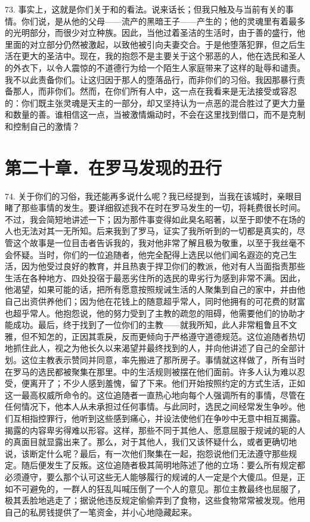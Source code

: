 73. 事实上，这就是你们关于和的看法。说来话长；但我只触及与当前有关的事情。你们说，是从他的父母——流产的黑暗王子——产生的；他的灵魂里有着最多的光明部分，而很少对立种族。因此，当他过着圣洁的生活时，由于善的盛行，他里面的对立部分仍然被激起，以致他被引向夫妻交合。于是他堕落犯罪，但之后生活在更大的圣洁中。现在，我的抱怨不是主要关于这个邪恶的人，他在选民和圣人的外衣下，以令人震惊的不道德行为给一个陌生人家庭带来了这样的耻辱和谴责。我不以此责备你们。让这归因于那人的堕落品行，而非你们的习俗。我因那暴行责备那人，而非你们。然而，在你们所有人中，这一点在我看来是无法接受或容忍的：你们既主张灵魂是天主的一部分，却又坚持认为一点恶的混合胜过了更大力量和数量的善。谁相信这一点，当被激情煽动时，不会在这里找到借口，而不是克制和控制自己的激情？\par


\section{第二十章．在罗马发现的丑行}

74. 关于你们的习俗，我还能再多说什么呢？我已经提到，当我在该城时，亲眼目睹了那些事情的发生。要详细叙述我不在时在罗马发生的一切，将耗费很长时间。不过，我会简短地讲述一下；因为那件事变得如此臭名昭著，以至于即使不在场的人也无法对其一无所知。后来我到了罗马，证实了我所听到的一切都是真实的，尽管这个故事是一位目击者告诉我的，我对他非常了解且极为敬重，以至于我丝毫不会怀疑。当时，你们的一位追随者，他完全配得上选民以他们闻名遐迩的克己生活，因为他受过良好的教育，并且热衷于捍卫你们的教派，他对有人当面指责那些生活在各种地方、四处投宿于最恶劣住所的选民的卑劣行为感到非常不满。因此，他渴望，如果可能的话，把所有愿意按照规诫生活的人聚集到自己的家中，并由他自己出资供养他们；因为他在花钱上的随意超乎常人，同时他拥有的可花费的财富也超乎常人。他抱怨说，他的努力受到了主教的疏忽的阻碍，他需要他们的协助才能成功。最后，终于找到了一位你们的主教——就我所知，此人非常粗鲁且不文雅，但不知怎的，正因其乖戾，反而更倾向于严格遵守道德规范。这位追随者热切地抓住此人，视之为他长久以来渴望并最终找到的人，并向他讲述了自己的全部计划。这位主教表示赞同并同意，率先搬进了那所房子。事情就这样做了，所有当时在罗马的选民都被聚集在那里。中的生活规则被摆在他们面前。许多人认为难以忍受，便离开了；不少人感到羞愧，留了下来。他们开始按照约定的方式生活，正如这一最高权威所命令的。这位追随者一直热心地向每个人强调所有的事情，尽管在任何情况下，他本人从未承担过任何事情。与此同时，选民之间经常发生争吵。他们互相指控罪行，他听到这些感到痛心，并设法使他们在争吵中无意中相互揭露。揭露的内容卑劣得难以形容。这样，那些不同于其他人、愿意屈服于规诫的轭的人的真面目就显露出来了。那么，对于其他人，我们又该怀疑什么，或者更确切地说，该断定什么呢？最后，有一次他们聚集在一起，抱怨说他们无法遵守那些规定。随后便发生了反叛。这位追随者极其简明地陈述了他的立场：要么所有规定都必须遵守，要么那个认可这些无人能够履行的规诫的人一定是个大傻瓜。但是，正如不可避免的，一群人的狂乱叫喊压倒了一个人的意见。那位主教最终也屈服了，极其丢脸地逃走了；据说他违反规定偷偷弄到了食物，这些食物常常被发现。他用自己的私房钱提供了一笔资金，并小心地隐藏起来。\par

